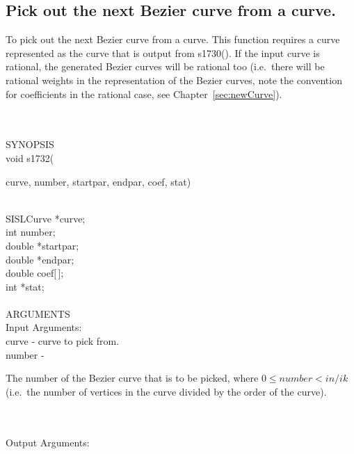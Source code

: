 \subsection{Pick out the next Bezier curve from a curve.}
\begin{minipg1}
  To pick out the next Bezier curve from a curve. This function requires a
  curve represented as the curve that is output from s1730().
  If the input curve is rational, the generated Bezier curves will be
  rational too (i.e.\ there will be rational weights in the
  representation of the Bezier curves, note the convention for coefficients in the
  rational case, see Chapter~\ref{sec:newCurve}).
\end{minipg1} \\ \\
SYNOPSIS\\
        \>void s1732(\begin{minipg3}
        {\fov curve}, {\fov number}, {\fov startpar}, {\fov endpar}, {\fov coef}, {\fov stat})
                \end{minipg3}\\[0.3ex]
                \>\>    SISLCurve       \>      *{\fov curve};\\
                \>\>    int     \>      {\fov number};\\
                \>\>    double  \>      *{\fov startpar};\\
                \>\>    double  \>      *{\fov endpar};\\
                \>\>    double  \>      {\fov coef}[\,];\\
                \>\>    int     \>      *{\fov stat};\\
\\
ARGUMENTS\\
        \>Input Arguments:\\
        \>\>    {\fov curve}    \> - \> curve to pick from.\\
        \>\>    {\fov number}   \> - \>\begin{minipg2}
                                The number of the Bezier curve that is
                                to be picked, where $0\leq number<in/ik$
                                (i.e.\ the number of vertices in the
                                curve divided by the order of the curve).
                                \end{minipg2}\\[0.8ex]
\\
        \>Output Arguments:\\
